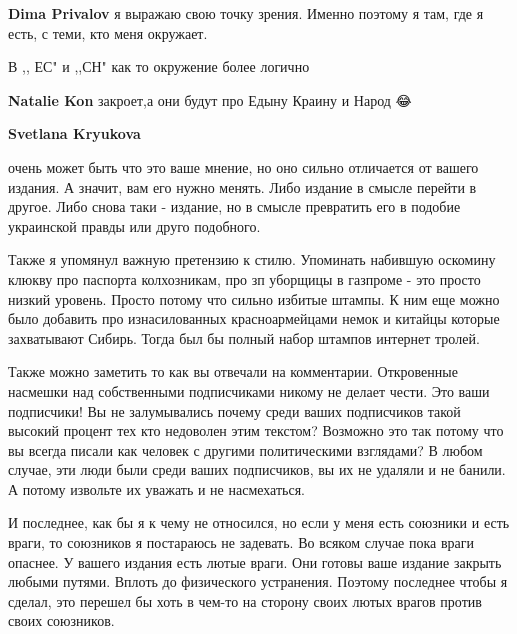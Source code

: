 \begin{itemize}
\begin{itemize}
\textbf{Dima Privalov} я выражаю свою точку зрения. Именно поэтому я там, где я есть, с теми, кто меня окружает.

 
В ,, ЕС" и ,,СН" как то окружение более логично

 
\textbf{Natalie Kon} закроет,а они будут про Едыну Краину и Народ 😂

 
\textbf{Svetlana Kryukova} 

очень может быть что это ваше мнение, но оно сильно отличается от вашего
издания. А значит, вам его нужно менять. Либо издание в смысле перейти в
другое. Либо снова таки - издание, но в смысле превратить его в подобие
украинской правды или друго подобного.

Также я упомянул важную претензию к стилю. Упоминать набившую оскомину клюкву
про паспорта колхозникам, про зп уборщицы в газпроме - это просто низкий
уровень. Просто потому что сильно избитые штампы. К ним еще можно было добавить
про изнасилованных красноармейцами немок и китайцы которые захватывают Сибирь.
Тогда был бы полный набор штампов интернет тролей.

Также можно заметить то как вы отвечали на комментарии. Откровенные насмешки
над собственными подписчиками никому не делает чести. Это ваши подписчики! Вы
не залумывались почему среди ваших подписчиков такой высокий процент тех кто
недоволен этим текстом? Возможно это так потому что вы всегда писали как
человек с другими политическими взглядами? В любом случае, эти люди были среди
ваших подписчиков, вы их не удаляли и не банили. А потому извольте их уважать и
не насмехаться.

И последнее, как бы я к чему не относился, но если у меня есть союзники и есть
враги, то союзников я постараюсь не задевать. Во всяком случае пока враги
опаснее. У вашего издания есть лютые враги. Они готовы ваше издание закрыть
любыми путями. Вплоть до физического устранения. Поэтому последнее чтобы я
сделал, это перешел бы хоть в чем-то на сторону своих лютых врагов против своих
союзников.


\end{itemize}
\end{itemize}
